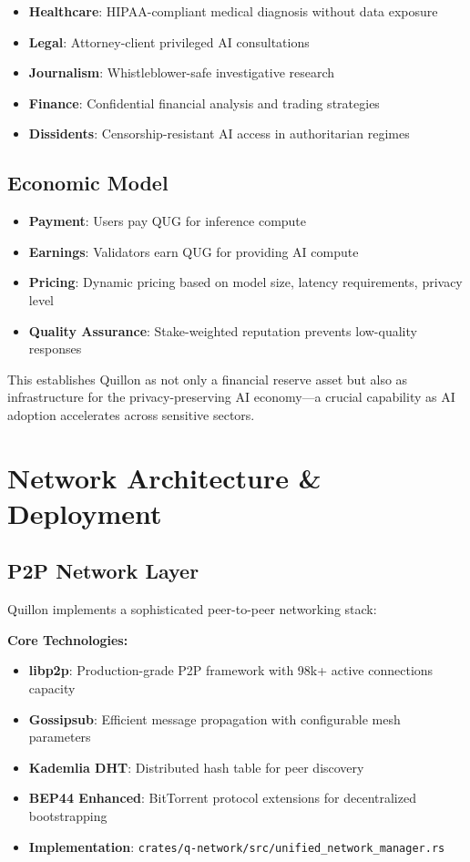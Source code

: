 \documentclass[11pt,a4paper]{scrartcl}
\begin{document}
\begin{itemize}
\item \textbf{Healthcare}: HIPAA-compliant medical diagnosis without data exposure
\item \textbf{Legal}: Attorney-client privileged AI consultations
\item \textbf{Journalism}: Whistleblower-safe investigative research
\item \textbf{Finance}: Confidential financial analysis and trading strategies
\item \textbf{Dissidents}: Censorship-resistant AI access in authoritarian regimes
\end{itemize}

\subsection{Economic Model}

\begin{itemize}
\item \textbf{Payment}: Users pay QUG for inference compute
\item \textbf{Earnings}: Validators earn QUG for providing AI compute
\item \textbf{Pricing}: Dynamic pricing based on model size, latency requirements, privacy level
\item \textbf{Quality Assurance}: Stake-weighted reputation prevents low-quality responses
\end{itemize}

This establishes Quillon as not only a financial reserve asset but also as infrastructure for the privacy-preserving AI economy—a crucial capability as AI adoption accelerates across sensitive sectors.

\newpage

\section{Network Architecture \& Deployment}

\subsection{P2P Network Layer}

Quillon implements a sophisticated peer-to-peer networking stack:

\textbf{Core Technologies:}
\begin{itemize}
\item \textbf{libp2p}: Production-grade P2P framework with 98k+ active connections capacity
\item \textbf{Gossipsub}: Efficient message propagation with configurable mesh parameters
\item \textbf{Kademlia DHT}: Distributed hash table for peer discovery
\item \textbf{BEP44 Enhanced}: BitTorrent protocol extensions for decentralized bootstrapping
\item \textbf{Implementation}: \texttt{crates/q-network/src/unified\_network\_manager.rs}
\end{itemize}
\end{document}
